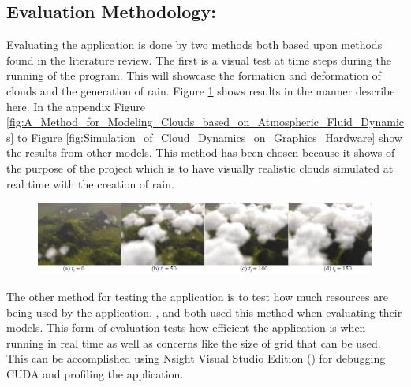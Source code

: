 \subsection{Evaluation Methodology:}
\label{eval_meth}
Evaluating the application is done by two methods both based upon methods found in the literature review.
The first is a visual test at time steps during the running of the program.
This will showcase the formation and deformation of clouds and the generation of rain.
Figure \ref{fig:Simple Realistic Animation of Clouds} shows \citet{DobashiEtAl00} results in the manner describe here.
In the appendix Figure \ref{fig:A_Method_for_Modeling_Clouds_based_on_Atmospheric_Fluid_Dynamics} to Figure \ref{fig:Simulation_of_Cloud_Dynamics_on_Graphics_Hardware} show the results from other models.
This method has been chosen because it shows of the purpose of the project which is to have visually realistic clouds simulated at real time with the creation of rain.

\begin{figure}[h!]
  \centering
  \includegraphics[width=\textwidth]{images/Simple_Realistic_Animation_of_Clouds.PNG}
  \caption{\citet{DobashiEtAl00}}
  \label{fig:Simple Realistic Animation of Clouds}
\end{figure}

The other method for testing the application is to test how much resources are being used by the application.
\citet*{MHarris01}, and \citet{Elek12} both used this method when evaluating their models.
This form of evaluation tests how efficient the application is when running in real time as well as concerns like the size of grid that can be used.
This can be accomplished using Nsight Visual Studio Edition (\citeyear{nvidiasight2013}) for debugging CUDA and profiling the application.